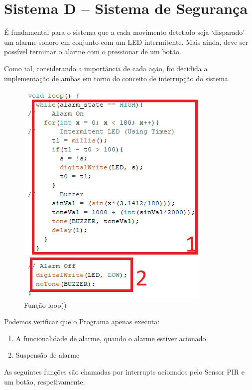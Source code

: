 \section{Sistema D – Sistema de Segurança}

É fundamental para o sistema que a cada movimento detetado seja `disparado' um alarme sonoro em conjunto com um LED intermitente. Mais ainda, deve ser possível terminar o alarme com o pressionar de um botão.

Como tal, considerando a importância de cada ação, foi decidida a implementação de ambas em torno do conceito de interrupção do sistema.

\begin{figure}[H]
    \centering
    \includegraphics{images/codigo/sisD_loop.png}
    \caption{Função loop()}
    \label{fig:my_label}
\end{figure}

Podemos verificar que o Programa apenas executa:
\begin{enumerate}
    \item A funcionalidade de alarme, quando o alarme estiver acionado
    \item Suspensão de alarme
\end{enumerate}

As seguintes funções são chamadas por interrupts acionados pelo Sensor PIR e um botão, respetivamente.

